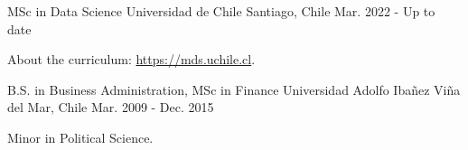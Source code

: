 

\begin{cventries}


  \cventry
    {MSc in Data Science} %
    {Universidad de Chile} %
    {Santiago, Chile} %
    {Mar. 2022 - Up to date} %
    {
      \begin{cvitems} %
        \item {About the curriculum: \href{https://mds.uchile.cl}{https://mds.uchile.cl}.}
      \end{cvitems}
    }
    
  \cventry
    {B.S. in Business Administration, MSc in Finance} %
    {Universidad Adolfo Ibañez} %
    {Viña del Mar, Chile} %
    {Mar. 2009 - Dec. 2015} %
    {
      \begin{cvitems} %
        \item {Minor in Political Science.}
      \end{cvitems}
    }

\end{cventries}
